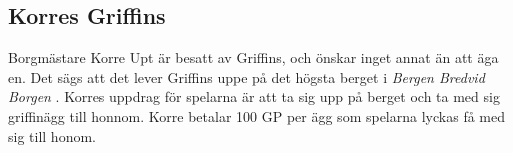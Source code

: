 \subsection{Korres Griffins}
\label{korresGriffins}
Borgmästare Korre Upt är besatt av Griffins, och önskar inget annat än att äga en. Det sägs att det lever Griffins uppe på det högsta berget i \textit{Bergen Bredvid Borgen} \sectiondescribe{\ref{bergenBredvidBorgen}}. Korres uppdrag för spelarna är att ta sig upp på berget och ta med sig griffinägg till honnom. Korre betalar 100 GP per ägg som spelarna lyckas få med sig till honom.